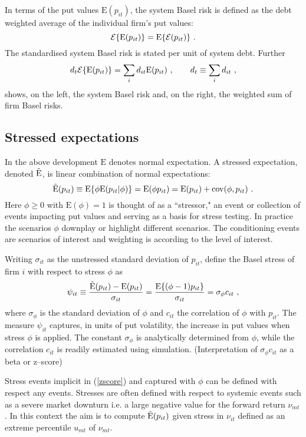 \documentclass[authoryear]{elsarticle}
\newcommand{\E}{\mathrm{E}}
\newcommand{\cov}{\mathrm{cov}}
\newcommand{\Ex}{{\cal E}}
\newcommand{\eref}[1]{(\ref{#1})}
\newcommand{\cq}{\ , \qquad}
\newcommand{\be}[1]{\begin{equation}\label{#1}}
\newcommand{\ee}{\end{equation}}
\begin{document}
In terms of the put values $\E(p_{it})$, the  system Basel risk is defined as the debt weighted average of the individual firm's put values:
\be{nsrisk}
\Ex\{\E(p_{it})\} = \E\{\Ex(p_{it})\}  \ . 
\ee
The standardised system Basel risk is stated per unit of system debt.  Further
$$
d_t\Ex\{\E(p_{it})\}  = \sum_id_{it}\E(p_{it}) \cq d_t\equiv\sum_id_{it}\ ,
$$
shows, on the left, the system Basel risk and, on the right, the weighted sum of firm Basel risks.  

\subsection{Stressed expectations}

In the above development $\E$  denotes  normal expectation.   A stressed expectation, denoted $\Es$, is 
linear combination of normal expectations:
\be{formula}
\Es(p_{it}) \equiv \E\{\phi\E(p_{it}|\phi)\} = \E(\phi p_{it}) = \E(p_{it}) + \cov(\phi,p_{it})\ .
\ee
Here $\phi\ge 0$ with $\E(\phi)=1$ is thought of as a ``stressor,"  an event or collection of events impacting put values and serving as a basis for stress testing.  In practice the scenarios $\phi$  downplay or highlight different scenarios.  The conditioning events are scenarios of interest and  weighting is according to the level of interest.


Writing  $\sigma_{it}$ as the unstressed standard deviation of $p_{it}$,  define the Basel stress of firm $i$ with respect to stress $\phi$ as
\be{zscore}
\psi_{it}\equiv \frac{\Es(p_{it})- \E(p_{it})}{\sigma_{it}}= \frac{\E\{(\phi-1)p_{it}\}}{\sigma_{it}} = \sigma_\phi c_{it} \ ,
\ee
where  $\sigma_\phi$ is the standard deviation of $\phi$ and $c_{it}$ the correlation of $\phi$ with $p_{it}$.  The measure $\psi_{it}$ captures, in units of put volatility, the increase in put values when  stress  $\phi$ is applied.  The constant $\sigma_\phi$ is analytically determined from $\phi$, while the correlation $c_{it}$  is  readily estimated using simulation.  (Interpretation of $\sigma_\phi c_{it}$ as a beta or z--score)

Stress events implicit in \eref{zscore} and captured with $\phi$ can be defined with respect any events.  Stresses are often defined with respect to systemic events such as a severe market downturn i.e. a large negative value for the forward return  $\nu_{mt}$.      In this context   the aim is to compute $\Es(p_{it})$  given stress in $\nu_{it}$ defined as an extreme   percentile $u_{mt}$ of $\nu_{mt}$.
\end{document}
